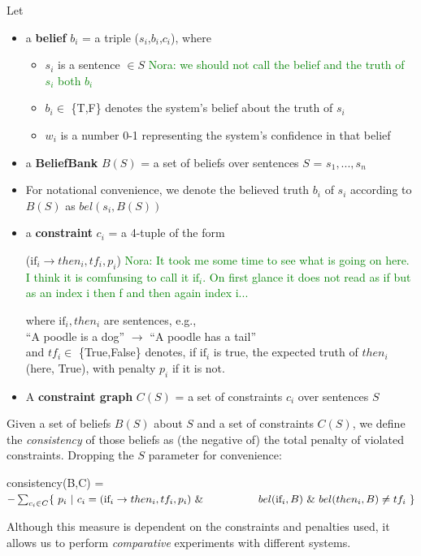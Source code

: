 \documentclass[11pt]{article}
\newcommand{\nk}[1]{\textcolor{green}{Nora: #1}}
\newenvironment{myquote}{                   %
  \parskip 0mm \begin{quoting}[vskip=0mm,leftmargin=2mm]}{
\end{quoting}}
\newenvironment{ite}{                     %
     \parskip 0cm \begin{itemize} \parskip 0cm \parsep 0cm \itemsep 0cm \topsep 0cm}{
        \end{itemize}} %
\begin{document}
\noindent Let
\vspace{-2mm}
\begin{ite}
 \item a {\bf belief} $b_i$ = a triple ($s_i$,$b_i$,$c_i$), where
    \begin{ite}
     \item $s_i$ is a sentence $\in S$ %
     \nk{we should not call the belief and the truth of $s_i$ both $b_i$}
     \item $b_i \in$ \{T,F\} denotes the system's belief about the truth of $s_i$
     \item $w_i$ is a number 0-1 representing the system's confidence in that belief
    \end{ite}
 \item a {\bf BeliefBank} $B(S)$ = a set of beliefs over sentences $S$ = $s_1,...,s_n$
 \item For notational convenience, we denote the believed truth $b_i$ of $s_i$ according to $B(S)$ as $bel(s_i,B(S))$
 \item a {\bf constraint} $c_i$ = a 4-tuple of the form
\begin{myquote} \centering
($\textrm{if}_i \rightarrow then_i, tf_i, p_i$)
\nk{It took me some time to see what is going on here. I think it is comfunsing to call it $\textrm{if}_i$. On first glance it does not read as if but as an index i then f and then again index i...}
\end{myquote} 
where $\textrm{if}_i, then_i$ are sentences, e.g., \\
\vspace{1mm}
\hspace*{1mm} ``A poodle is a dog'' $\rightarrow$ ``A poodle has a tail'' \\
\vspace{1mm} 
and $tf_i \in$ \{True,False\} denotes, if $\textrm{if}_i$ is true, the expected truth of $then_i$ (here, True),
with penalty $p_i$ if it is not.
\item A {\bf constraint graph} $C(S)$ = a set of constraints $c_i$ over sentences $S$
\end{ite}
Given a set of beliefs $B(S)$ about $S$ and a set of constraints $C(S)$, we define the {\it consistency}
of those beliefs as (the negative of) the total penalty of violated constraints.
Dropping the $S$ parameter for convenience:
 \begin{myquote}
  consistency(B,C) = \\
\hspace*{2mm}  $- \sum_{c_i \in C} \{~ p_i ~ | ~ c_i = (\textrm{if}_i \rightarrow then_i, tf_i, p_i )       ~\& \\
\hspace*{18mm}  bel(\textrm{if}_i,B) ~ \& ~ bel(then_i,B) \neq tf_i~ \}$
\end{myquote}
Although this measure is dependent on the constraints and penalties used,
it allows us to perform {\it comparative} experiments with different systems.
\end{document}
